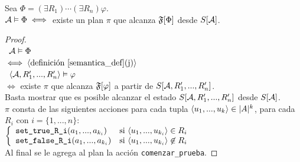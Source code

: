 \begin{theorem}
Sea $\Phi = (\exists R_1)\cdots(\exists R_n) \varphi$.
\\ $\mathcal{A} \vDash \Phi \iff$ existe un plan $\pi$ que alcanza $\mathfrak{F}[\Phi]$ desde $S[\mathcal{A}]$.
\end{theorem}
\begin{proof}
\ \\ \mbox{\hspace{5mm} $\mathcal{A} \vDash \Phi$}\\
\noindent $\iff \langle \text{definición \ref{semantica_def}(j)} \rangle$ \\
\mbox{\hspace{5mm} $\langle \mathcal{A}, R_1',...,R_n' \rangle \vDash \varphi$}\\
\noindent $\iff $ existe $\pi$ que alcanza $\mathfrak{F}[\varphi]$ a partir de $S[\mathcal{A},
R_1',...,R_n']$.\\
\noindent Basta mostrar que es posible alcanzar el estado $S[\mathcal{A}, R_1',...,R_n']$ desde
$S[\mathcal{A}]$.\\
$\pi$ consta de las siguientes acciones
para cada tupla $\langle u_1,...,u_k \rangle \in |A|^k$, para cada $R_i$ con $i =
\{1,...,n\}$:\\
$\left\{\begin{array}{ll}
\texttt{set\_true\_R\_i}(a_1,...,a_{k_i}) & \text{si } \langle u_1,...,u_{k_i} \rangle \in R_i\\
\texttt{set\_false\_R\_i}(a_1,...,a_{k_i}) & \text{si } \langle u_1,...,u_{k_i} \rangle \not\in R_i\\
\end{array}\right.$\\
Al final se le agrega al plan la acción \texttt{comenzar\_prueba}.
\end{proof}

%
%
%
